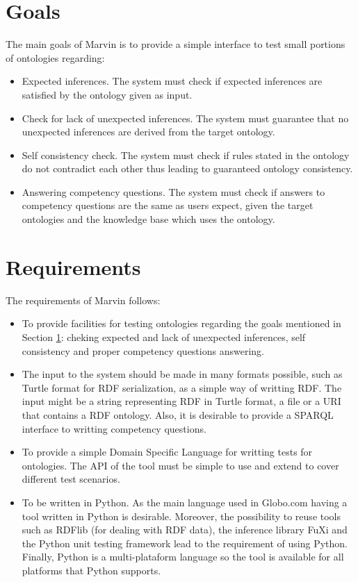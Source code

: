\documentclass{report}
\begin{document}
\section{Goals}
\label{goals}

The main goals of Marvin is to provide a simple interface to test small portions of ontologies regarding:

\begin{itemize}
    \item Expected inferences. The system must check if expected inferences are satisfied by the ontology
        given as input.
    \item Check for lack of unexpected inferences. The system must guarantee that no unexpected inferences are
        derived from the target ontology.
    \item Self consistency check. The system must check if rules stated in the ontology do not
        contradict each other thus leading to guaranteed ontology consistency.
    \item Answering competency questions. The system must check if answers to competency questions are
        the same as users expect, given the target ontologies and the knowledge base which uses the ontology.
\end{itemize}

\section{Requirements}

The requirements of Marvin follows:
\begin{itemize}
    \item To provide facilities for testing ontologies regarding the goals mentioned in Section \ref{goals}: cheking
        expected and lack of unexpected inferences, self consistency and proper competency questions answering.
    \item The input to the system should be made in many formats possible, such as Turtle format for RDF serialization,
        as a simple way of writting RDF. The input might be a string representing RDF in Turtle format, a file or a
        URI that contains a RDF ontology. Also, it is desirable to provide a SPARQL interface to writting competency questions.
    \item To provide a simple Domain Specific Language for writting tests for ontologies. The API of the tool must be simple
        to use and extend to cover different test scenarios.
    \item To be written in Python. As the main language used in Globo.com having a tool written in Python is desirable.
        Moreover, the possibility to reuse tools such as RDFlib (for dealing with RDF data), the inference library FuXi
        and the Python unit testing framework lead to the requirement of using Python.
        Finally, Python is a multi-plataform language so the tool is available for all platforms that Python supports.
\end{itemize}
\end{document}
